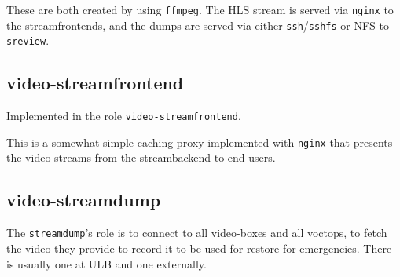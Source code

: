 \documentclass{article}
\begin{document}
These are both created by using \texttt{ffmpeg}. The HLS stream is served via \texttt{nginx} to the streamfrontends, and the dumps are served via either \texttt{ssh}/\texttt{sshfs} or NFS to \texttt{sreview}.

\subsection{video-streamfrontend}

Implemented in the role \texttt{video-streamfrontend}.

This is a somewhat simple caching proxy implemented with \texttt{nginx} that presents the video streams from the streambackend to end users.

\subsection{video-streamdump}

The \texttt{streamdump}'s role is to connect to all video-boxes and all voctops, to fetch the video they provide to record it to be used for restore for emergencies. There is usually one at ULB and one externally.
\end{document}
